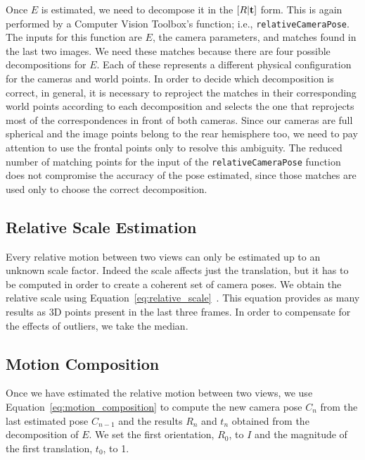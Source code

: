 Once $E$ is estimated, we need to decompose it in the 
\( [R|\mathbf{t} ] \) form. This is again performed by a Computer Vision 
Toolbox's function; i.e., {\tt relativeCameraPose}.
The inputs for this function are $E$, the camera parameters, and matches found in the last two images.
We need these matches because there are four possible decompositions for $E$. Each of these represents a different physical configuration for the cameras and world points.
In order to decide which decomposition is correct, in general, it is necessary to reproject the matches in their corresponding world points according to each 
decomposition and selects the one that reprojects most of the correspondences in 
front of both cameras.
Since our cameras are full spherical and the image points belong to the 
rear hemisphere too, we need to pay attention to use the frontal points only to resolve this ambiguity. 
The reduced number of matching points for the input of the 
{\tt relativeCameraPose} function does not compromise the accuracy of the pose 
estimated, since those matches are used only to choose the 
correct decomposition.
%

\subsection{Relative Scale Estimation}
Every relative motion between two views can only be estimated up to an unknown 
scale factor. Indeed the scale affects just the translation, but it has to 
be computed in order to create a coherent set of camera poses.
We obtain the relative scale using 
Equation~\ref{eq:relative_scale}~\cite{scaramuzzaVisualOdometryI}.
This equation provides as many results as 3D points present in the last three
frames. In order to compensate for the effects of outliers, we take the 
median.

\subsection{Motion Composition}
Once we have estimated the relative motion between two views, we use 
Equation~\ref{eq:motion_composition} to compute the new camera pose $C_n$ from 
the last estimated pose $C_{n-1}$ and the results $R_{n}$ and $t_n$ obtained 
from the decomposition of $E$.
We set the first orientation, $R_0$, to $I$ and the magnitude of the first 
translation, $t_0$, to 1.

